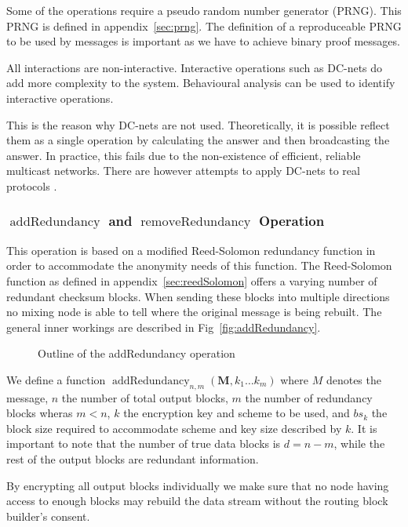 \documentclass[9pt,journal,compsoc]{IEEEtran}
\DeclareMathOperator{\addRedundancy}{addRedundancy}
\DeclareMathOperator{\removeRedundancy}{removeRedundancy}
\begin{document}
Some of the operations require a pseudo random number generator (PRNG). This PRNG is defined in appendix~\ref{sec:prng}. The definition of a reproduceable PRNG to be used by messages is important as we have to achieve binary proof messages.

All interactions are non-interactive. Interactive operations such as DC-nets do add more complexity to the system. Behavioural analysis can be used to identify interactive operations. 

This is the reason why DC-nets are not used. Theoretically, it is possible reflect them as a single operation by calculating the answer and then broadcasting the answer. In practice, this fails due to the non-existence of efficient, reliable multicast networks. There are however attempts to apply DC-nets to real protocols \cite{Corrigan-Gibbs:2010:DAA:1866307.1866346}.

\subsubsection{$\addRedundancy$ and $\removeRedundancy$ Operation}
This operation is based on a modified Reed-Solomon redundancy function in order to accommodate the anonymity needs of this function. The Reed-Solomon function as defined in appendix~\ref{sec:reedSolomon} offers a varying number of redundant checksum blocks. When sending these blocks into multiple directions no mixing node is able to tell where the original message is being rebuilt. The general inner workings are described in Fig~\ref{fig:addRedundancy}.

\begin{figure}[htb]
	\resizebox{0.9\columnwidth}{!}{}
	\caption{Outline of the addRedundancy operation}
	\label{fig:addRedundancyOperation}
\end{figure}

We define a function $\addRedundancy_{n,m}( \mathbf{M},k_1\ldots k_{m} )$ where $M$ denotes the message, $n$ the number of total output blocks, $m$ the number of redundancy blocks wheras $m<n$, $k$ the encryption key and scheme to be used, and $bs_k$ the block size required to accommodate scheme and key size described by $k$. It is important to note that the number of true data blocks is $d=n-m$, while the rest of the output blocks are redundant information.

By encrypting all output blocks individually we make sure that no node having access to enough blocks may rebuild the data stream without the routing block builder's consent.
\end{document}
